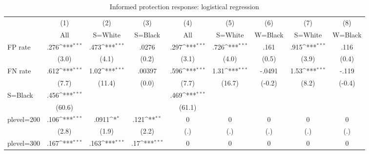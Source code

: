\begin{table}[htbp]\centering
\def\sym#1{\ifmmode^{#1}\else\(^{#1}\)\fi}
\caption{Informed protection response: logistical regression}
\begin{tabular}{l*{8}{c}}
\hline\hline
                &\multicolumn{1}{c}{(1)}&\multicolumn{1}{c}{(2)}&\multicolumn{1}{c}{(3)}&\multicolumn{1}{c}{(4)}&\multicolumn{1}{c}{(5)}&\multicolumn{1}{c}{(6)}&\multicolumn{1}{c}{(7)}&\multicolumn{1}{c}{(8)}\\
                &\multicolumn{1}{c}{All}&\multicolumn{1}{c}{S=White}&\multicolumn{1}{c}{S=Black}&\multicolumn{1}{c}{All}&\multicolumn{1}{c}{S=White}&\multicolumn{1}{c}{W=Black}&\multicolumn{1}{c}{S=White}&\multicolumn{1}{c}{W=Black}\\
\hline
FP rate         &     .276\sym{***}&     .473\sym{***}&    .0276         &     .297\sym{***}&     .726\sym{***}&     .161         &     .915\sym{***}&     .116         \\
                &    (3.0)         &    (4.1)         &    (0.2)         &    (3.1)         &    (4.0)         &    (0.5)         &    (3.9)         &    (0.4)         \\
FN rate         &     .612\sym{***}&     1.02\sym{***}&   .00397         &     .596\sym{***}&     1.31\sym{***}&   -.0491         &     1.53\sym{***}&    -.119         \\
                &    (7.7)         &   (11.4)         &    (0.0)         &    (7.7)         &   (16.7)         &   (-0.2)         &    (8.2)         &   (-0.4)         \\
S=Black         &     .456\sym{***}&                  &                  &     .469\sym{***}&                  &                  &                  &                  \\
                &   (60.6)         &                  &                  &   (61.1)         &                  &                  &                  &                  \\
plevel=200      &     .106\sym{***}&    .0911\sym{*}  &     .121\sym{**} &        0         &        0         &        0         &        0         &        0         \\
                &    (2.8)         &    (1.9)         &    (2.2)         &      (.)         &      (.)         &      (.)         &      (.)         &      (.)         \\
plevel=300      &     .167\sym{***}&     .163\sym{***}&      .17\sym{***}&        0         &        0         &        0         &        0         &        0         \\

\end{tabular}
\end{table}
